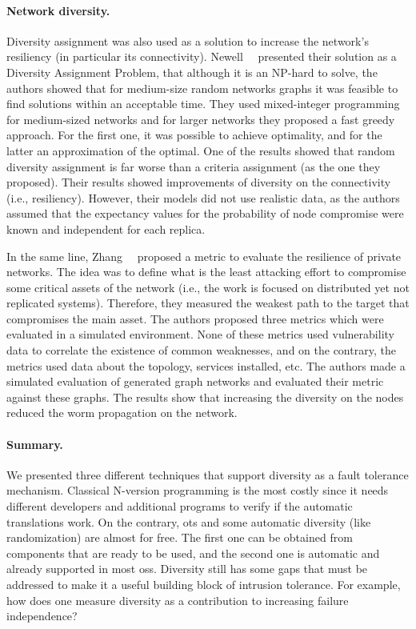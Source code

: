 \paragraph{Network diversity.}
Diversity assignment was also used as a solution to increase the network's resiliency (in particular its connectivity).
Newell~\etal{}~\cite{Newell:2015} presented their solution as a Diversity Assignment Problem, that although it is an NP-hard to solve, the authors showed that for medium-size random networks graphs it was feasible to find solutions within an acceptable time.
They used mixed-integer programming for medium-sized networks and for larger networks they proposed a fast greedy approach.
For the first one, it was possible to achieve optimality, and for the latter an approximation of the optimal.
One of the results showed that random diversity assignment is far worse than a criteria assignment (as the one they proposed).
Their results showed improvements of diversity on the connectivity (i.e., resiliency).
However, their models did not use realistic data, as the authors assumed that the expectancy values for the probability of node compromise were known and independent for each replica.


In the same line, Zhang~\etal{}~\cite{Zhang:2016} proposed a metric to evaluate the resilience of private networks.
The idea was to define what is the least attacking effort to compromise some critical assets of the network (i.e., the work is focused on distributed yet not replicated systems).
Therefore, they measured the weakest path to the target that compromises the main asset. 
The authors proposed three metrics which were evaluated in a simulated environment.
None of these metrics used vulnerability data to correlate the existence of common weaknesses, and on the contrary, the metrics used data about the topology, services installed, etc.
The authors made a simulated evaluation of generated graph networks and evaluated their metric against these graphs. 
The results show that increasing the diversity on the nodes reduced the worm propagation on the network.
 

\paragraph{Summary.}
We presented three different techniques that support diversity as a fault tolerance mechanism. 
Classical N-version programming is the most costly since it needs different developers and additional programs to verify if the automatic translations work. 
On the contrary, \gls{ots} and some automatic diversity (like randomization) are almost for free. 
The first one can be obtained from components that are ready to be used, and the second one is automatic and already supported in most \glspl{os}. 
Diversity still has some gaps that must be addressed to make it a useful building block of intrusion tolerance. 
For example, how does one measure diversity as a contribution to increasing failure independence?



